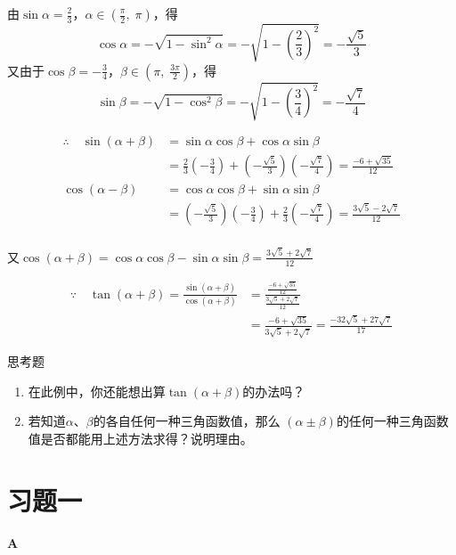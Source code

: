 \begin{solution}
由$\sin\alpha=\frac{2}{3}$，$\alpha\in\left(\frac{\pi}{2},\; \pi\right)$，得
\[\cos\alpha=-\sqrt{1-\sin^2\alpha}=-\sqrt{1-\left(\frac{2}{3}\right)^2}=-\frac{\sqrt{5}}{3}\]
又由于$\cos\beta=-\frac{3}{4}$，$\beta\in\left(\pi,\; \frac{3\pi}{2}\right)$，得
\[\sin\beta=-\sqrt{1-\cos^2\beta}=-\sqrt{1-\left(\frac{3}{4}\right)^2}=-\frac{\sqrt{7}}{4}\]

\[\begin{split}
    \therefore\quad \sin(\alpha+\beta)&=\sin\alpha\cos\beta+\cos\alpha\sin\beta\\
&=\frac{2}{3}\left(-\frac{3}{4}\right)+\left(-\frac{\sqrt{5}}{3}\right)\left(-\frac{\sqrt{7}}{4}\right)=\frac{-6+\sqrt{35}}{12}\\
\cos(\alpha-\beta)&=\cos\alpha\cos\beta+\sin\alpha\sin\beta\\
&=\left(-\frac{\sqrt{5}}{3}\right)\left(-\frac{3}{4}\right)+\frac{2}{3}\left(-\frac{\sqrt{7}}{4}\right)=\frac{3\sqrt{5}-2\sqrt{7}}{12}\\
\end{split}\]

又$\cos(\alpha+\beta)=\cos\alpha\cos\beta-\sin\alpha\sin\beta=\frac{3\sqrt{5}+2\sqrt{7}}{12}$

\[\begin{split}
\because\quad \tan(\alpha+\beta)=\frac{\sin(\alpha+\beta)}{\cos(\alpha+\beta)}&=\frac{\frac{-6+\sqrt{35}}{12}}{\frac{3\sqrt{5}+2\sqrt{7}}{12}}\\
&=\frac{-6+\sqrt{35}}{3\sqrt{5}+2\sqrt{7}}=\frac{-32\sqrt{5}+27\sqrt{7}}{17}
\end{split}\]
\end{solution}

\begin{thm}
    {思考题}
\begin{enumerate}[(1)]
\item 在此例中，你还能想出算$\tan(\alpha+\beta)$的办法吗？
\item 若知道$\alpha$、$\beta$的各自任何一种三角函数值，那么
$(\alpha\pm\beta)$的任何一种三角函数值是否都能用上述方法求得？说明理由。
\end{enumerate}
\end{thm}

\section*{习题一}
\begin{center}
    \bfseries A
\end{center}


